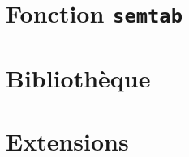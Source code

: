 \documentclass{article}
\begin{document}
 \thispagestyle{empty}
 \tableofcontents
 \pagebreak
 \setcounter{page}{1}

 \section{Fonction \texttt{semtab}}

 \section{Bibliothèque}

 \section{Extensions}

 
\end{document}
